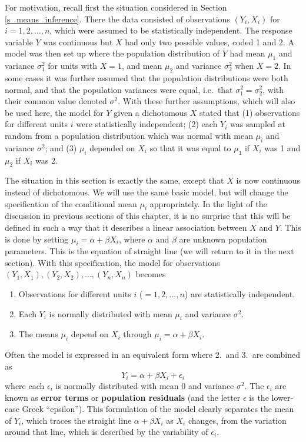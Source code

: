 For motivation, recall first the situation considered in Section
\ref{s_means_inference}. There the data consisted of observations $(Y_{i},
X_{i})$ for $i=1,2,\dots,n$, which were assumed to be statistically
independent. The response variable $Y$ was continuous but $X$ had only
two possible values, coded 1 and 2. A model was then set up where the
population distribution of $Y$ had mean $\mu_{1}$ and variance
$\sigma^{2}_{1}$ for units with $X=1$, and mean $\mu_{2}$ and variance
$\sigma^{2}_{2}$ when $X=2$. In some cases it was further assumed that
the population distributions were both normal, and that the population
variances were equal, i.e.\ that $\sigma^{2}_{1}=\sigma^{2}_{2}$, with
their common value denoted $\sigma^{2}$. With these further assumptions,
which will also be used here, the model for $Y$ given a dichotomous $X$
stated that (1) observations for different units $i$ were statistically
independent; (2) each $Y_{i}$ was sampled at random from a population
distribution which was normal with mean $\mu_{i}$ and variance
$\sigma^{2}$; and (3) $\mu_{i}$ depended on $X_{i}$ so that it was equal
to $\mu_{1}$ if $X_{i}$ was 1 and $\mu_{2}$ if $X_{i}$ was 2.

The situation in this section is exactly the same, except that $X$ is
now continuous instead of dichotomous. We will use the same basic
model, but will change the specification of the conditional mean
$\mu_{i}$ appropriately. In the light of the discussion in previous
sections of this chapter, it is no surprise that this will be defined in
such a way that it describes a linear association between $X$ and $Y$.
This is done by setting $\mu_{i}=\alpha+\beta X_{i}$, where $\alpha$ and
$\beta$ are unknown population parameters. This is the equation of
straight line (we will return to it
in the next section). With this specification, the model for observations
$(Y_{1},X_{1}), (Y_{2}, X_{2}), \dots, (Y_{n}, X_{n})$ becomes
\begin{enumerate}
\item
Observations for different units $i$ ($=1,2,\dots,n$) are statistically
independent.
\item
Each $Y_{i}$ is normally distributed with mean $\mu_{i}$ and variance
$\sigma^{2}$.
\item
The means $\mu_{i}$ depend on $X_{i}$ through $\mu_{i}=\alpha+\beta
X_{i}$.
\end{enumerate}
Often the model is expressed in an equivalent form where 2.\ and 3.\ are
combined as
\begin{equation}
Y_{i}=\alpha+\beta X_{i} +\epsilon_{i}
\label{slinmodel}
\end{equation}
where each $\epsilon_{i}$ is normally distributed with mean 0 and
variance $\sigma^{2}$. The $\epsilon_{i}$ are known as \textbf{error
terms} or \textbf{population residuals} (and the letter $\epsilon$ is
the lower-case Greek ``epsilon''). This formulation of the model clearly
separates the mean of $Y_{i}$, which traces the straight line
$\alpha+\beta X_{i}$ as $X_{i}$ changes, from the variation around that
line, which is described by the variability of $\epsilon_{i}$.

